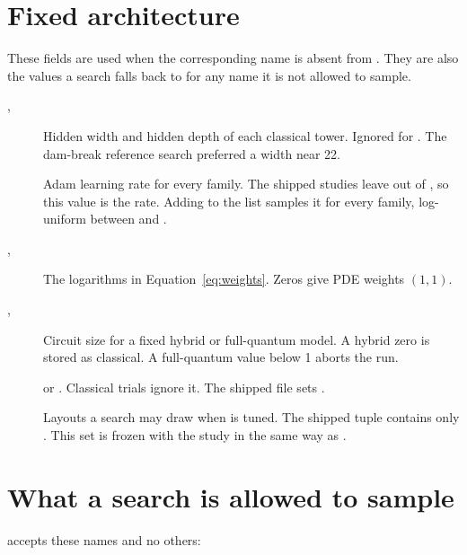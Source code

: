 \section{Fixed architecture}

These fields are used when the corresponding name is absent from .
They are also the values a search falls back to for any name it is not allowed to sample.

\begin{description}
\item[, ]
Hidden width and hidden depth of each classical tower.
Ignored for .
The dam-break reference search preferred a width near 22.

\item[]
Adam learning rate for every family.
The shipped studies leave  out of , so this value is the rate.
Adding  to the list samples it for every family, log-uniform between  and .

\item[, ]
The logarithms in Equation~\eqref{eq:weights}.
Zeros give PDE weights \((1,1)\).

\item[, ]
Circuit size for a fixed hybrid or full-quantum model.
A hybrid zero is stored as classical.
A full-quantum value below 1 aborts the run.

\item[]
 or .
Classical trials ignore it.
The shipped file sets .

\item[]
Layouts a search may draw when  is tuned.
The shipped tuple contains only .
This set is frozen with the study in the same way as .
\end{description}

\section{What a search is allowed to sample}

 accepts these names and no others:

